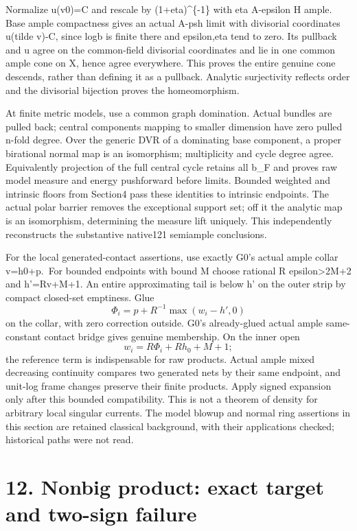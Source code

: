 \documentclass[
  10pt,
]{article}
\begin{document}
Normalize u(v0)=C and rescale by (1+eta)\^{}\{-1\} with eta A-epsilon H
ample. Base ample compactness gives an actual A-psh limit with
divisorial coordinates u(tilde v)-C, since log\textbar b\textbar{} is
finite there and epsilon,eta tend to zero. Its pullback and u agree on
the common-field divisorial coordinates and lie in one common ample cone
on X, hence agree everywhere. This proves the entire genuine cone
descends, rather than defining it as a pullback. Analytic surjectivity
reflects order and the divisorial bijection proves the homeomorphism.

At finite metric models, use a common graph domination. Actual bundles
are pulled back; central components mapping to smaller dimension have
zero pulled n-fold degree. Over the generic DVR of a dominating base
component, a proper birational normal map is an isomorphism;
multiplicity and cycle degree agree. Equivalently projection of the full
central cycle retains all b\_F and proves raw model measure and energy
pushforward before limits. Bounded weighted and intrinsic floors from
Section4 pass these identities to intrinsic endpoints. The actual polar
barrier removes the exceptional support set; off it the analytic map is
an isomorphism, determining the measure lift uniquely. This
independently reconstructs the substantive native121 semiample
conclusions.

For the local generated-contact assertions, use exactly G0's actual
ample collar v=h0+p.~For bounded endpoints with bound M choose rational
R epsilon\textgreater2M+2 and h'=Rv+M+1. An entire approximating tail is
below h' on the outer strip by compact closed-set emptiness. Glue \[
 \Phi_i=p+R^{-1}\max(w_i-h',0)
\] on the collar, with zero correction outside. G0's already-glued
actual ample same-constant contact bridge gives genuine membership. On
the inner open \[
 w_i=R\Phi_i+Rh_0+M+1;
\] the reference term is indispensable for raw products. Actual ample
mixed decreasing continuity compares two generated nets by their same
endpoint, and unit-log frame changes preserve their finite products.
Apply signed expansion only after this bounded compatibility. This is
not a theorem of density for arbitrary local singular currents. The
model blowup and normal ring assertions in this section are retained
classical background, with their applications checked; historical paths
were not read.

\section{12. Nonbig product: exact target and two-sign
failure}\label{nonbig-product-exact-target-and-two-sign-failure}
\end{document}
